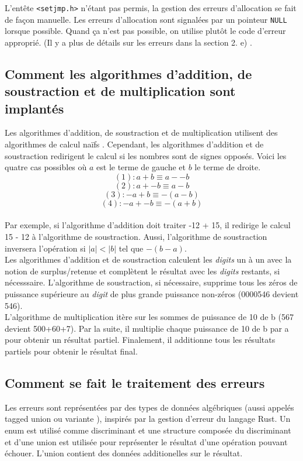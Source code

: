 \documentclass[a4paper,12pt,french]{article}
\begin{document}
		L'entête \lstinline$<setjmp.h>$ n'étant pas permis, la gestion des erreurs d'allocation se fait de
		façon manuelle. Les erreurs d'allocation sont signalées par un pointeur \lstinline$NULL$ lorsque
		possible. Quand ça n'est pas possible, on utilise plutôt le code d'erreur approprié.
		(Il y a plus de détails sur les erreurs dans la section 2. e) .\\
		\subsection{Comment les algorithmes d’addition, de soustraction et de multiplication sont implantés}
		Les algorithmes d'addition, de soustraction et de multiplication utilisent des algorithmes de calcul \og naïfs \fg{}. Cependant, les algorithmes d'addition et de soustraction redirigent le calcul si les nombres sont de signes opposés. Voici les quatre cas possibles où $a$ est le terme de gauche et $b$ le terme de droite.
		\[ (1) : a + b \equiv a - -b\]
		\[ (2) : a + -b \equiv a - b  \]
		\[ (3) : -a + b \equiv -(a-b) \]
		\[ (4) : -a + -b \equiv -(a+b) \]
		\\Par exemple, si l'algorithme d'addition doit traiter -12 + 15, il redirige le calcul 15 - 12 à l'algorithme de soustraction. Aussi, l'algorithme de soustraction inversera l'opération si $|a| < |b|$ tel que $-(b-a)$.\\

		Les algorithmes d'addition et de soustraction calculent les \textit{digits} un à un avec la notion de surplus/retenue et complètent le résultat avec les \textit{digits} restants, si nécesssaire. L'algorithme de soustraction, si nécessaire, supprime tous les zéros de puissance supérieure au \textit{digit} de plus grande puissance non-zéros (0000546 devient 546).\\

		L'algorithme de multiplication itère sur les sommes de puissance de 10 de b (567 devient 500+60+7). Par la suite, il multiplie chaque puissance de 10 de b par a pour obtenir un résultat partiel. Finalement, il additionne tous les résultats partiels pour obtenir le résultat final.
		\subsection{Comment se fait le traitement des erreurs}
		Les erreurs sont représentées par des types de données algébriques (aussi appelés  \og tagged union \fg{}
		ou \og variante \fg{}), inspirés par la gestion d'erreur du langage Rust. Un enum est utilisé comme
		discriminant et une structure composée du discriminant et d'une union est utilisée pour représenter
		le résultat d'une opération pouvant échouer. L'union contient des données additionelles sur le
		résultat.\\
\end{document}
